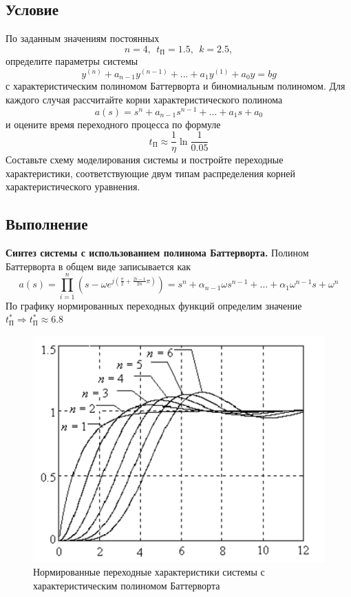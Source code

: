 \documentclass[a4paper, 12pt]{article}
\begin{document}
    \subsection{Условие}
    По заданным значениям постоянных $$n=4,\ \ t_{\text{П}}=1.5,\ \ k=2.5,$$ определите
    параметры системы $$y^{(n)}+a_{n-1}y^{(n-1)}+...+a_1y^{(1)}+a_0y=bg$$
    с характеристическим полиномом Баттерворта и биномиальным полиномом.
    Для каждого случая рассчитайте корни характеристического полинома
    $$a(s)=s^n+a_{n-1}s^{n-1}+...+a_1s+a_0$$
    и оцените время переходного процесса по формуле $$t_{\text{П}}\approx\dfrac{1}{\eta}\ln{\dfrac{1}{0.05}}$$
    Составьте схему моделирования системы и постройте переходные характеристики,
    соответствующие двум типам распределения корней характеристического уравнения.


    \subsection{Выполнение}
    \textbf{Синтез системы с использованием полинома Баттерворта.}
    Полином Баттерворта в общем виде записывается как
    $$a(s)=\prod_{i=1}^{n}\left(s-\omega e^{j\left(\frac{\pi}{2}+\frac{2i-1}{2n}\pi\right)}\right)=s^n+\alpha_{n-1}\omega s^{n-1}+...+\alpha_1\omega^{n-1}s+\omega^n$$
    По графику нормированных переходных функций определим значение $t^*_{\text{П}}\Rightarrow t^*_{\text{П}}\approx6.8$
    \begin{figure}[H]
        \centering
        \includegraphics[scale=0.7]{norm_tf_bat.png}
        \captionsetup{skip=0pt}
        \caption{Нормированные переходные характеристики системы с характеристическим полиномом Баттерворта}
        \label{fig:norm_tf_bat}
    \end{figure}
\end{document}

